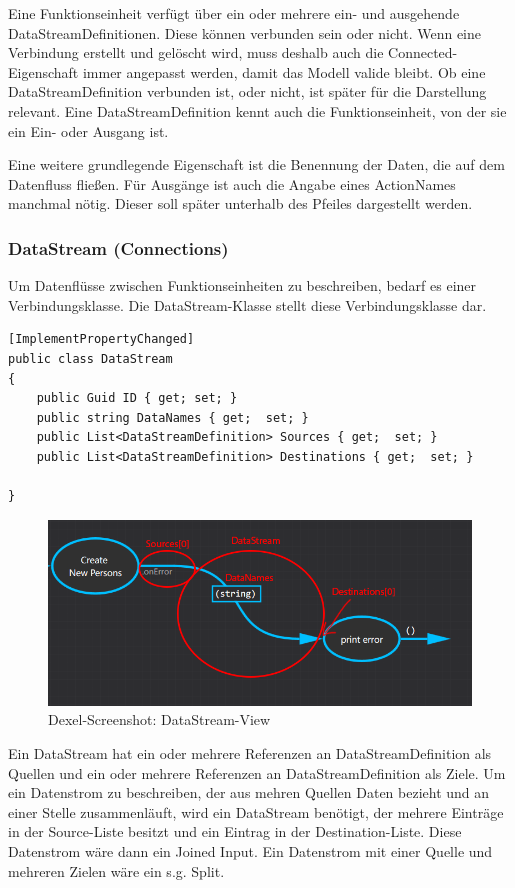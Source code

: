 	Eine Funktionseinheit verfügt über ein oder mehrere ein- und ausgehende
	DataStreamDefinitionen. Diese können verbunden sein oder nicht. Wenn eine
	Verbindung erstellt und gelöscht wird, muss deshalb auch die Connected-Eigenschaft
	immer angepasst werden, damit das Modell valide bleibt.
	Ob eine DataStreamDefinition verbunden ist, oder nicht, ist später
	für die Darstellung relevant.
	Eine DataStreamDefinition kennt auch die Funktionseinheit, von der sie ein
	Ein- oder Ausgang ist.
	
	Eine weitere grundlegende Eigenschaft ist die Benennung der Daten, die auf dem
  Datenfluss fließen. Für Ausgänge ist auch die Angabe eines
	ActionNames manchmal nötig. Dieser soll später unterhalb des Pfeiles
	dargestellt werden.

\subsubsection{DataStream (Connections)}

Um Datenflüsse zwischen Funktionseinheiten zu beschreiben, bedarf es einer
Verbindungsklasse. Die DataStream-Klasse stellt diese Verbindungsklasse dar.


\begin{lstlisting}[caption=DataStream]
[ImplementPropertyChanged]
public class DataStream
{
	public Guid ID { get; set; }
	public string DataNames { get;  set; }
	public List<DataStreamDefinition> Sources { get;  set; }
	public List<DataStreamDefinition> Destinations { get;  set; }

}
\end{lstlisting}

		\begin{figure}[H]
			\centering
			\includegraphics[width=0.9\linewidth]{./img/DataStreamView.png} 
			\caption{Dexel-Screenshot: DataStream-View}
		\end{figure}


Ein DataStream hat ein oder mehrere Referenzen an DataStreamDefinition als
Quellen und ein oder mehrere Referenzen an DataStreamDefinition als Ziele.
Um ein Datenstrom zu beschreiben, der aus mehren Quellen Daten bezieht und
an einer Stelle zusammenläuft, wird ein DataStream benötigt, der mehrere
Einträge in der Source-Liste besitzt und ein Eintrag in der
Destination-Liste. Diese Datenstrom wäre dann ein Joined Input.
Ein Datenstrom mit einer Quelle und mehreren Zielen wäre ein s.g. Split.

